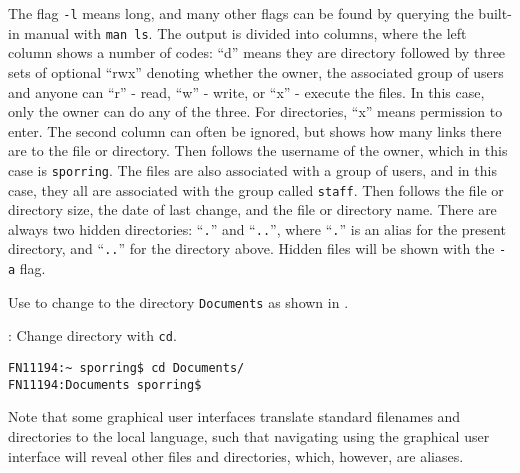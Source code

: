 The flag \lstinline[language=console]{-l} means long, and many other flags can be found by querying the built-in manual with \lstinline[language=console]{man ls}. The output is divided into columns, where the left column shows a number of codes:  ``d'' means they are directory followed by three sets of optional ``rwx'' denoting whether the owner, the associated group of users and anyone can ``r'' - read, ``w'' - write, or ``x'' - execute the files. In this case, only the owner can do any of the three. For directories, ``x'' means permission to enter. The second column can often be ignored, but shows how many links there are to the file or directory. Then follows the username of the owner, which in this case is \lstinline[language=console]{sporring}. The files are also associated with a group of users, and in this case, they all are associated with the group called \lstinline[language=console]{staff}. Then follows the file or directory size, the date of last change, and the file or directory name. There are always two hidden directories: ``\lstinline[language=console]{.}'' and ``\lstinline[language=console]{..}'', where ``\lstinline[language=console]{.}'' is an alias for the present directory, and ``\lstinline[language=console]{..}'' for the directory above. Hidden files will be shown with the \lstinline[language=console]{-a} flag.

Use  to change to the directory \lstinline[language=console]{Documents} as shown in .
\begin{codeNOutput}[label=LinuxCd]{: Change directory with \lstinline[language=console]{cd}.}
  \begin{lstlisting}[language=console,escapechar=§]
FN11194:~ sporring$ cd Documents/
FN11194:Documents sporring$ 
\end{lstlisting}
\end{codeNOutput}
Note that some graphical user interfaces translate standard filenames and directories to the local language, such that navigating using the graphical user interface will reveal other files and directories, which, however, are aliases. 

